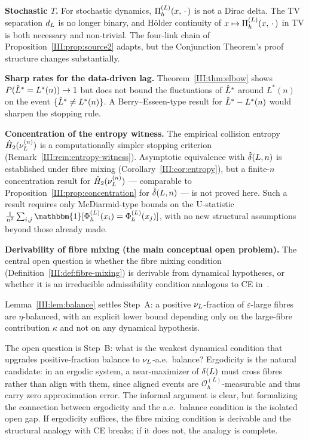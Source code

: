 \textbf{Stochastic $T$.}
For stochastic dynamics, $\Pi_h^{(L)}(x,\,\cdot\,)$ is not a Dirac delta.
The TV separation $d_{L}$ is no longer binary, and Hölder continuity
of $x \mapsto \Pi_h^{(L)}(x,\,\cdot\,)$ in TV is both necessary and non-trivial.
The four-link chain of Proposition~\ref{III:prop:source2} adapts, but the
Conjunction Theorem's proof structure changes substantially.

\textbf{Sharp rates for the data-driven lag.}
Theorem~\ref{III:thm:elbow} shows $P(\hat{L}^* = L^*(n)) \to 1$ but does not bound
the fluctuations of $\hat{L}^*$ around $L^*(n)$ on the event $\{\hat{L}^* \neq L^*(n)\}$.
A Berry--Esseen-type result for $\hat{L}^* - L^*(n)$ would sharpen the stopping rule.

\textbf{Concentration of the entropy witness.}
The empirical collision entropy $\hat{H}_2(\nu_L^{(n)})$ is a computationally
simpler stopping criterion (Remark~\ref{III:rem:entropy-witness}).
Asymptotic equivalence with $\hat{\delta}(L,n)$ is established under fibre mixing
(Corollary~\ref{III:cor:entropy}), but a finite-$n$ concentration result for
$\hat{H}_2(\nu_L^{(n)})$ --- comparable to Proposition~\ref{III:prop:concentration}
for $\hat{\delta}(L,n)$ --- is not proved here.
Such a result requires only McDiarmid-type bounds on the U-statistic
$\frac{1}{n^2}\sum_{i,j} \mathbbm{1}[\PhiL(x_i) = \PhiL(x_j)]$, with no
new structural assumptions beyond those already made.

\textbf{Derivability of fibre mixing (the main conceptual open problem).}
The central open question is whether the fibre mixing condition
(Definition~\ref{III:def:fibre-mixing}) is derivable from dynamical hypotheses, or
whether it is an irreducible admissibility condition analogous to CE in~\cite{mahon_paper1}.

Lemma~\ref{III:lem:balance} settles Step~A: a positive $\nu_L$-fraction of
$\varepsilon$-large fibres are $\eta$-balanced, with an explicit lower bound
depending only on the large-fibre contribution $\kappa$ and not on any dynamical
hypothesis.

The open question is Step~B: what is the weakest dynamical condition that
upgrades positive-fraction balance to $\nu_L$-a.e.\ balance?  Ergodicity is the
natural candidate: in an ergodic system, a near-maximizer of $\delta(L)$ must
cross fibres rather than align with them, since aligned events are
$\mathcal{O}_h^{(L)}$-measurable and thus carry zero approximation error.  The
informal argument is clear, but formalizing the connection between ergodicity
and the a.e.\ balance condition is the isolated open gap.  If ergodicity
suffices, the fibre mixing condition is derivable and the structural analogy
with CE breaks; if it does not, the analogy is complete.

\ifstandalone


\fi
